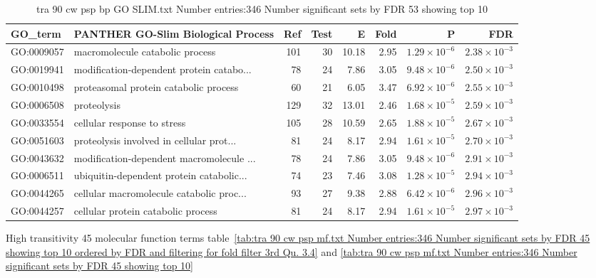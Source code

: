 \begin{table}[ht]
\centering
\begin{adjustbox}{width=\textwidth}
\begin{tabular}{llrrrrrr}
  \hline
GO\_term & PANTHER GO-Slim Biological Process & Ref & Test & E & Fold & P & FDR \\ 
  \hline
GO:0009057 & macromolecule catabolic process  & 101 & 30 & 10.18 & 2.95 & $1.29 \times 10^{-6}$ & $2.38 \times 10^{-3}$ \\ 
  GO:0019941 & modification-dependent protein catabo... & 78 & 24 & 7.86 & 3.05 & $9.48 \times 10^{-6}$ & $2.50 \times 10^{-3}$ \\ 
  GO:0010498 & proteasomal protein catabolic process  & 60 & 21 & 6.05 & 3.47 & $6.92 \times 10^{-6}$ & $2.55 \times 10^{-3}$ \\ 
  GO:0006508 & proteolysis  & 129 & 32 & 13.01 & 2.46 & $1.68 \times 10^{-5}$ & $2.59 \times 10^{-3}$ \\ 
  GO:0033554 & cellular response to stress  & 105 & 28 & 10.59 & 2.65 & $1.88 \times 10^{-5}$ & $2.67 \times 10^{-3}$ \\ 
  GO:0051603 & proteolysis involved in cellular prot... & 81 & 24 & 8.17 & 2.94 & $1.61 \times 10^{-5}$ & $2.70 \times 10^{-3}$ \\ 
  GO:0043632 & modification-dependent macromolecule ... & 78 & 24 & 7.86 & 3.05 & $9.48 \times 10^{-6}$ & $2.91 \times 10^{-3}$ \\ 
  GO:0006511 & ubiquitin-dependent protein catabolic... & 74 & 23 & 7.46 & 3.08 & $1.28 \times 10^{-5}$ & $2.94 \times 10^{-3}$ \\ 
  GO:0044265 & cellular macromolecule catabolic proc... & 93 & 27 & 9.38 & 2.88 & $6.42 \times 10^{-6}$ & $2.96 \times 10^{-3}$ \\ 
  GO:0044257 & cellular protein catabolic process  & 81 & 24 & 8.17 & 2.94 & $1.61 \times 10^{-5}$ & $2.97 \times 10^{-3}$ \\ 
  \hline
\end{tabular}
\end{adjustbox}
\caption{tra 90 cw psp bp GO SLIM.txt Number entries:346 Number significant sets by FDR 53 showing top 10} 
\label{tab:tra 90 cw psp bp GO SLIM.txt Number entries:346 Number significant sets by FDR 53 showing top 10}
\end{table}

High transitivity 45 molecular function terms table~\ref{tab:tra 90 cw psp mf.txt Number entries:346 Number significant sets by FDR 45 showing top 10 ordered by FDR and filtering for fold filter 3rd Qu. 3.4}
and \ref{tab:tra 90 cw psp mf.txt Number entries:346 Number significant sets by FDR 45 showing top 10}

